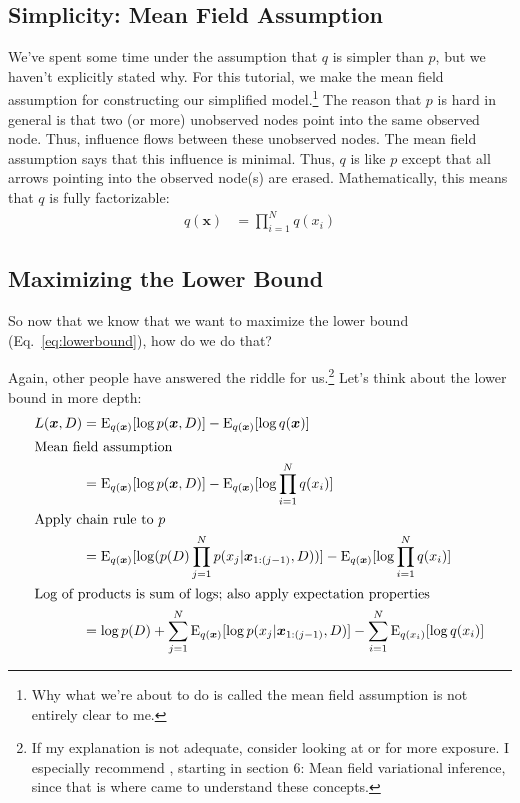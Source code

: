 \documentclass[12pt]{article}
\newcommand{\E}{\operatorname{E}}
\begin{document}
\subsection{Simplicity:  Mean Field Assumption}

We've spent some time under the assumption that $q$ is simpler than $p$, but we
haven't explicitly stated why.  For this tutorial, we make the mean field
assumption for constructing our simplified model.\footnote{Why what we're about
to do is called the mean field assumption is not entirely clear to me.}  The
reason that $p$ is hard in general is that two (or more) unobserved nodes point
into the same observed node.  Thus, influence flows between these unobserved
nodes.  The mean field assumption says that this influence is minimal.  Thus,
$q$ is like $p$ except that all arrows pointing into the observed node(s) are
erased.  Mathematically, this means that $q$ is fully factorizable:
\begin{align}\label{eq:q}
    q(\bm{x}) &= \prod_{i=1}^{N} q(x_{i})
\end{align}

\subsection{Maximizing the Lower Bound}

So now that we know that we want to maximize the lower bound
(Eq.~\ref{eq:lowerbound}), how do we do that?

Again, other people have answered the riddle for us.\footnote{If my explanation
is not adequate, consider looking at \autocite{wikivar} or
\autocite{bleinotesvar} for more exposure.  I especially recommend
\autocite{bleinotesvar}, starting in section 6:  Mean field variational
inference, since that is where came to understand these concepts.}  Let's think
about the lower bound in more depth:
\begin{align}
    L(\bm{x},D) &= \E_{q(\bm{x})}[\log p(\bm{x},D)]
    - \E_{q(\bm{x})}[\log q(\bm{x})]
    \nonumber \\
    \intertext{Mean field assumption}
    &= \E_{q(\bm{x})}[\log p(\bm{x},D)]
    - \E_{q(\bm{x})}[\log \prod_{i=1}^{N} q(x_{i})]
    \nonumber \\
    \intertext{Apply chain rule to $p$}
    &= \E_{q(\bm{x})}[\log (p(D)\prod_{j=1}^{N}p(x_{j}|\bm{x}_{1:(j-1)}, D))]
    - \E_{q(\bm{x})}[\log \prod_{i=1}^{N} q(x_{i})]
    \nonumber \\
    \intertext{Log of products is sum of logs; also apply expectation properties}
    &= \log p(D) + \sum_{j=1}^{N} \E_{q(\bm{x})}[\log p(x_{j}|\bm{x}_{1:(j-1)},D)]
    - \sum_{i=1}^{N} \E_{q(x_{i})}[\log q(x_{i})]
\end{align}
\end{document}

